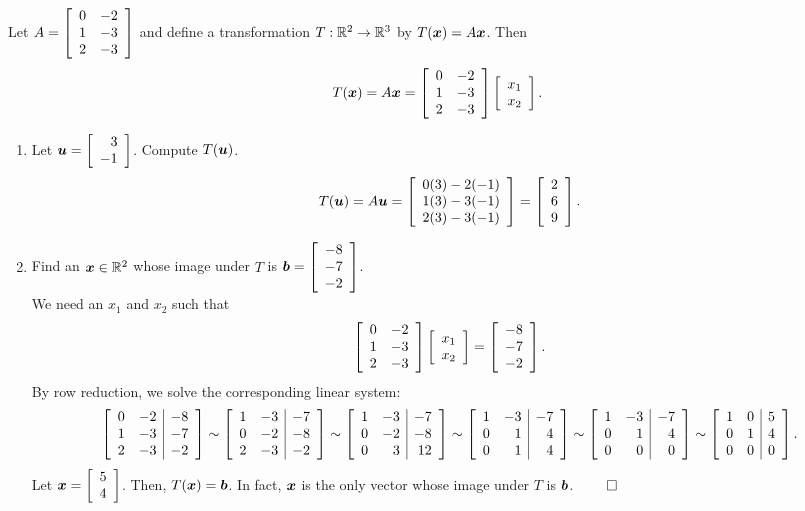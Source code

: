 \begin{Exam} Let $A = \mtx{rr}{  0 & -2 \\ 1 & -3 \\ 2 & -3}$ and define a transformation $T : \R^2 \to \R^3$ by $T(\bb x) = A\bb x$. Then 
\[T(\bb x) = A\bb x = \mtx{rr}{ 0 & -2 \\ 1 & -3 \\ 2 & -3}\vr{x_1\\x_2}.\]\vs

\begin{enumerate}
\item Let $\bb u = \vr{3\\-1}$. Compute $T(\bb u)$.\\

\[T(\bb u) = A\bb u = \vr{0(3) - 2(-1) \\ 1(3) - 3(-1) \\ 2(3) - 3(-1)} = \vr{2\\6\\9}.\]

\item Find an $\bb x\in \R^2$ whose image under $T$ is $\bb b = \vr{-8\\-7\\-2}$.\\

We need an $x_1$ and $x_2$ such that \[\mtx{rr}{  0 & -2 \\ 1 & -3 \\ 2 & -3}\vr{x_1\\x_2} = \vr{-8\\-7\\-2}.\] By row reduction, we solve the corresponding linear system:
\[\mtx{rr|r}{ 0 & -2 & -8 \\ 1 & -3 & -7 \\ 2 & -3 & -2} \sim \mtx{rr|r}{ 1 & -3 & -7 \\ 0 & -2 & -8 \\  2 & -3 & -2} \sim \mtx{rr|r}{ 1 & -3 & -7 \\ 0 & -2 & -8 \\  0 & 3 & 12} \sim 
\mtx{rr|r}{ 1 & -3 & -7 \\ 0 & 1 & 4 \\  0 & 1 & 4}\sim \mtx{rr|r}{ 1 & -3 & -7 \\ 0 & 1 & 4 \\  0 & 0 & 0}
\sim \mtx{rr|r}{ 1 & 0 & 5 \\ 0 & 1 & 4 \\  0 & 0 & 0}.\] Let $\bb x = \vr{5\\4}$. Then, $T(\bb x) = \bb b$. In fact, $\bb x$ is the only vector whose image under $T$ is $\bb b$. \hfill$\qedhere$
\end{enumerate}
\end{Exam}


